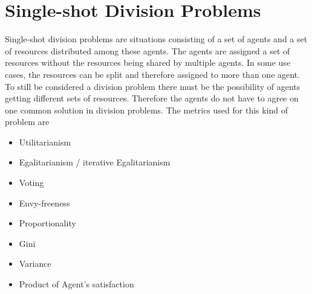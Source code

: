 \documentclass[german, a4paper, 11pt, oneside]{scrbook}
\begin{document}
\section{Single-shot Division Problems}
Single-shot division problems are situations consisting of a set of agents and a set of resources distributed among these agents. The agents are assigned a set of resources without the resources being shared by multiple agents. In some use cases, the resources can be split and therefore assigned to more than one agent. To still be considered a division problem there must be the possibility of agents getting different sets of resources. Therefore the agents do not have to agree on one common solution in division problems. The metrics used for this kind of problem are
\begin{itemize}
  \item Utilitarianism
  \item Egalitarianism / iterative Egalitarianism
  \item Voting
  \item Envy-freeness
  \item Proportionality
\item Gini
\item Variance
\item Product of Agent's satisfaction
\end{itemize}
\end{document}
